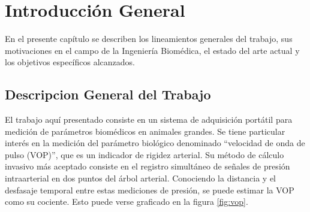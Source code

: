 
\chapter{Introducción General} %

\label{Chapter1} %
\label{IntroGeneral}


\newcommand{\keyword}[1]{\textbf{#1}}
\newcommand{\tabhead}[1]{\textbf{#1}}
\newcommand{\code}[1]{\texttt{#1}}
\newcommand{\file}[1]{\texttt{\bfseries#1}}
\newcommand{\option}[1]{\texttt{\itshape#1}}
\newcommand{\grados}{$^{\circ}$}


En el presente capítulo se describen los lineamientos generales del trabajo, sus motivaciones en el campo de la Ingeniería Biomédica, el estado del arte actual y los objetivos específicos alcanzados.


\section{Descripcion General del Trabajo}

El trabajo aquí presentado consiste en un sistema de adquisición portátil para medición de parámetros biomédicos en animales grandes. Se tiene particular interés en la medición del parámetro biológico denominado \enquote{velocidad de onda de pulso (VOP)}, que es un indicador de rigidez arterial. Su método de cálculo invasivo más aceptado consiste en el registro simultáneo de señales de presión intraarterial en dos puntos del árbol arterial. Conociendo la distancia y el desfasaje temporal entre estas mediciones de presión, se puede estimar la VOP como su cociente. Esto puede verse graficado en la figura \ref{fig:vop}.

